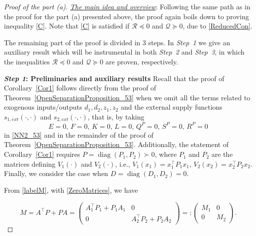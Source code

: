 \documentclass[11pt,a4paper,oneside,DIV=12,headings=small]{scrartcl}
\newcommand{\cQ}{\mathcal{Q}}
\newcommand{\cR}{\mathcal{R}}
\newcommand{\diag}{\operatorname{diag}}
\theoremstyle{plain}
\begin{document}
\begin{proof}[Proof of the part (a)]
\emph{\underline{The main idea and overview}}: Following the same path as in the proof for the part (a) presented above, the proof again boils down to proving inequality \eqref{C}. Note that \eqref{C} is satisfied if $\cR \preceq 0$ and $\cQ \succeq 0$, due to \eqref{ReducedCon}.

The remaining part of the proof is divided in 3 steps. In \emph{Step~1} we give an auxiliary result which will be instrumental in both \emph{Step~2} and \emph{Step~3}, in which the inequalities $\cR \preceq 0$ and $\cQ \succeq 0$ are proven, respectively.

\medskip

\textbf{\emph{Step 1}: Preliminaries and auxiliary results} \newline
Recall that the proof of Corollary~\ref{Cor1} follows directly from the proof of Theorem~\ref{OpenSeparationProposition_53} when we omit all the terms related to exogenous inputs/outputs $d_1, d_2, z_1, z_2$ and the external supply functions $s_{1,ext}(\cdot,\cdot)$ and $s_{2,ext}(\cdot,\cdot)$, that is, by taking 
\begin{equation}
\label{ZeroMatrices}
E=0,\, F=0,\, K=0,\, L=0,\, Q^P=0,\, S^P=0,\, R^P=0
\end{equation}
in \eqref{NN2_53} and in the remainder of the proof of Theorem~\ref{OpenSeparationProposition_53}. 
Additionally, the statement of Corollary~\ref{Cor1} requires $P=\diag(P_1,P_2) \succ 0$, where $P_1$ and $P_2$ are the matrices defining $V_1(\cdot)$ and $V_2(\cdot)$, i.e., $V_1(x_1)=x_1^\top P_1 x_1$, $V_2(x_2)=x_2^\top P_2 x_2$.
Finally, we consider the case when $D=\diag(D_1,D_2)=0$.  
  

From \eqref{labelM}, with \eqref{ZeroMatrices},  we have

\begin{equation}
M=A^\top P +P A=\begin{pmatrix} A_1^\top P_1 + P_1 A_1 & 0 \\ 0 & A_2^\top P_2 + P_2 A_2\end{pmatrix}=:\begin{pmatrix} M_1 & 0 \\ 0 & M_2 \end{pmatrix}. 
\end{equation} 
  

\end{proof}
\end{document}
